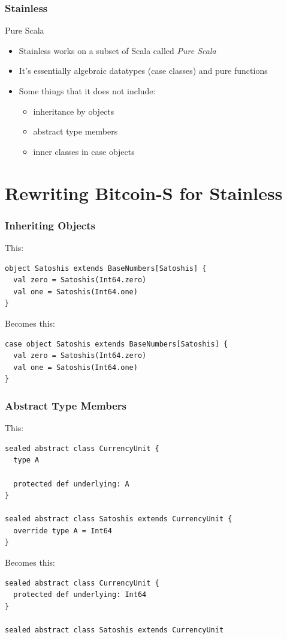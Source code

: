 \documentclass{beamer}
\begin{document}
\begin{frame}
\frametitle{Stainless}
\begin{block}{Pure Scala}
\begin{itemize}
  \item Stainless works on a subset of Scala called \emph{Pure Scala}
  \item It's essentially algebraic datatypes (case classes) and pure functions
  \item Some things that it does not include:
    \begin{itemize}
    \item inheritance by objects
    \item abstract type members
    \item inner classes
      in case objects
\end{itemize}

\end{itemize}
\end{block}
\end{frame}


\section{Rewriting Bitcoin-S for Stainless}



\begin{frame}[fragile]
\frametitle{Inheriting Objects}
This:
\begin{lstlisting}[style=scala]
object Satoshis extends BaseNumbers[Satoshis] {
  val zero = Satoshis(Int64.zero)
  val one = Satoshis(Int64.one)
}
\end{lstlisting}

Becomes this:
\begin{lstlisting}[style=scala]
case object Satoshis extends BaseNumbers[Satoshis] {
  val zero = Satoshis(Int64.zero)
  val one = Satoshis(Int64.one)
}
\end{lstlisting}
\end{frame}


\begin{frame}[fragile]
\frametitle{Abstract Type Members}
This:
\begin{lstlisting}[style=scala]
sealed abstract class CurrencyUnit {
  type A

  protected def underlying: A
}

sealed abstract class Satoshis extends CurrencyUnit {
  override type A = Int64
}
\end{lstlisting}

Becomes this:
\begin{lstlisting}[style=scala]
sealed abstract class CurrencyUnit {
  protected def underlying: Int64
}

sealed abstract class Satoshis extends CurrencyUnit
\end{lstlisting}
\end{frame}
\end{document}
